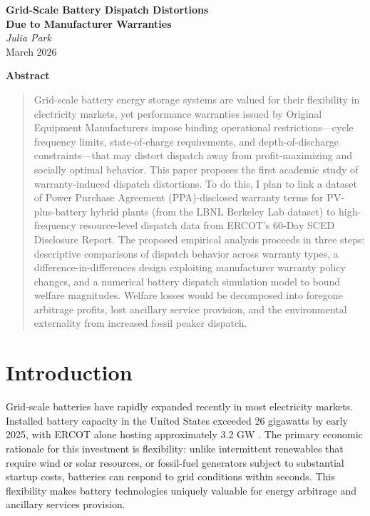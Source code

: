 \documentclass[12pt]{article}
\begin{document}
\begin{center}
  {\LARGE\bfseries Grid-Scale Battery Dispatch Distortions\\[6pt]
    Due to Manufacturer Warranties}\\[1cm]
  {\large\itshape Julia Park}\\[0.4cm]
  {\large March 2026}
\end{center}

\vspace{1cm}

\begin{center}{\bfseries Abstract}\end{center}
\begin{quote}
\noindent Grid-scale battery energy storage systems are valued for their flexibility in electricity markets, yet performance warranties issued by Original Equipment Manufacturers impose binding operational restrictions---cycle frequency limits, state-of-charge requirements, and depth-of-discharge constraints---that may distort dispatch away from profit-maximizing and socially optimal behavior. This paper proposes the first academic study of warranty-induced dispatch distortions. To do this, I plan to link a dataset of Power Purchase Agreement (PPA)-disclosed warranty terms for PV-plus-battery hybrid plants (from the LBNL Berkeley Lab dataset) to high-frequency resource-level dispatch data from ERCOT's 60-Day SCED Disclosure Report. The proposed empirical analysis proceeds in three steps: descriptive comparisons of dispatch behavior across warranty types, a difference-in-differences design exploiting manufacturer warranty policy changes, and a numerical battery dispatch simulation model to bound welfare magnitudes. Welfare losses would be decomposed into foregone arbitrage profits, lost ancillary service provision, and the environmental externality from increased fossil peaker dispatch. 
\end{quote}

\vspace{1cm}

\section{Introduction}

Grid-scale batteries have rapidly expanded recently in most electricity markets. Installed battery capacity in the United States exceeded 26 gigawatts by early 2025, with ERCOT alone hosting approximately 3.2 GW \citep{reynolds2025}. The primary economic rationale for this investment is flexibility: unlike intermittent renewables that require wind or solar resources, or fossil-fuel generators subject to substantial startup costs, batteries can respond to grid conditions within seconds. This flexibility makes battery technologies uniquely valuable for energy arbitrage and ancillary services provision.
\end{document}
